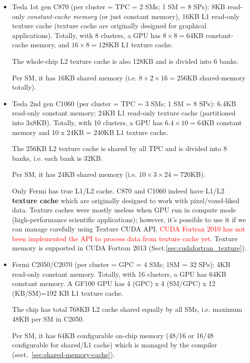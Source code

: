   \begin{itemize}
  \item Tesla 1st gen C870 (per cluster = TPC = 2 SMs; 1 SM = 8 SPs):
    8KB read-only {\it constant-cache memory} (or just constant
    memory), 16KB L1 read-only texture cache (texture cache are
    originally designed for graphical applications). Totally, with 8
    clusters, a GPU has $8\times 8=64$KB constant-cache memory, and
    $16\times 8=128$KB L1 texture cache.

    The whole-chip L2 texture cache is also 128KB and is divided into
    6 banks.

    Per SM, it has 16KB shared memory (i.e. $8\times 2\times 16=256$KB
    shared-memory totally).

  \item Tesla 2nd gen C1060 (per cluster = TPC = 3 SMs; 1 SM = 8 SPs):
    6.4KB read-only constant memory; 24KB L1 read-only texture
    cache (partitioned into 3x8KB). Totally, with 10 clusters, a GPU has
    $6.4\times 10=64$KB constant memory and 10 x 24KB = 240KB L1 texture cache.

    The 256KB L2 texture cache is shared by all TPC and is divided
    into 8 banks, i.e. each bank is 32KB.

    Per SM, it has 24KB shared memory (i.e. $10\times 3\times
    24=720$KB). 

    \begin{framed}
      Only Fermi has true L1/L2 cache.  C870 and C1060 indeed have
      L1/L2 {\bf texture cache} which are originally designed to work
      with pixel/voxel-liked data. Texture caches were mostly useless
      when GPU run in compute mode (high-performance scientific
      applications); however, it's possible to use it if we can manage
      carefully using Texture CUDA API.
      \textcolor{red}{CUDA Fortran 2010 has not been implemented the
        API to process data from texture cache yet}. Texture memory is supported 
        in CUDA Fortran 2013 (Sect.\ref{sec:cudafortran_texture}).
    \end{framed}

  \item Fermi C2050/C2070 (per cluster = GPC = 4 SMs; 1SM = 32 SPs):
    4KB read-only constant memory. Totally, with 16 clusters, a GPU
    has 64KB constant memory. A GF100 GPU has 4 (GPC) x 4 (SM/GPC) x 12
    (KB/SM)=192 KB L1 texture cache. 

    The chip has total 768KB L2 cache shared equally by all SMs,
    i.e. maximum 48KB per SM in C2050.

    Per SM, it has 64KB configurable on-chip memory (48/16 or 16/48
    configurable for shared/L1 cache) which is managed by the compiler
    (sect.~\ref{sec:shared-memory-cache}).
  \end{itemize}

